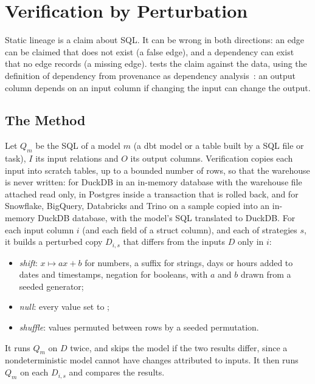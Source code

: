 \section{Verification by Perturbation}
\label{sec:verify}

Static lineage is a claim about SQL. It can be wrong in both directions: an edge can be claimed
that does not exist (a false edge), and a dependency can exist that no edge records (a missing
edge).  tests the claim against the data, using the definition of
dependency from provenance as dependency analysis~\citep{cheney2007dependency}: an output column
depends on an input column if changing the input can change the output.

\subsection{The Method}

Let $Q_m$ be the SQL of a model $m$ (a dbt model or a table built by a SQL file or task), $I$ its
input relations and $O$ its output columns. Verification copies each input into scratch tables,
up to a bounded number of rows, so that the warehouse is never written: for DuckDB in an in-memory database with the warehouse
file attached read only,
in Postgres inside a transaction that is rolled back, and for Snowflake, BigQuery, Databricks and
Trino on a sample copied into an in-memory DuckDB database, with the model's SQL translated to
DuckDB. For each input column $i$ (and each field of a struct column), and each of \perturbations{}
strategies $s$, it builds a perturbed copy $D_{i,s}$ that differs from the inputs $D$ only in $i$:
\begin{itemize}
  \item \emph{shift}: $x \mapsto a x + b$ for numbers, a suffix for strings, days or hours added
  to dates and timestamps, negation for booleans, with $a$ and $b$ drawn from a seeded generator;
  \item \emph{null}: every value set to ;
  \item \emph{shuffle}: values permuted between rows by a seeded permutation.
\end{itemize}
It runs $Q_m$ on $D$ twice, and skips the model if the two results differ, since a
nondeterministic model cannot have changes attributed to inputs. It then runs $Q_m$ on each
$D_{i,s}$ and compares the results.

